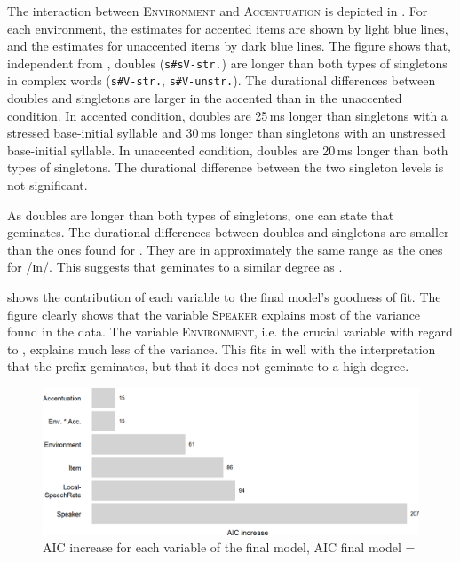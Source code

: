 The interaction between \textsc{Environment} and \textsc{Accentuation} is depicted in . For each environment, the estimates for accented items are shown by light blue lines, and the estimates for unaccented items by dark blue lines.
The figure shows that,  
independent from , doubles (\texttt{s\#sV-str.}) are longer than both types of singletons in complex words (\texttt{s\#V-str.}, \texttt{s\#V-unstr.}). The durational differences between doubles and singletons are larger in the accented than in the unaccented condition. 
In accented condition, doubles are 25\,ms longer than singletons with a stressed base-initial syllable and 30\,ms longer than singletons with an unstressed base-initial syllable. 
In unaccented condition, doubles are 20\,ms longer than both types of singletons. 
The durational difference between the two singleton levels is not significant.

As doubles are longer than both types of singletons, one can state that  geminates. The durational differences between doubles and singletons are smaller than the ones found for . They are in approximately the same range as the ones for /ɪn/. This suggests that  geminates to a similar degree as .



 shows the contribution of each variable to the final model's goodness of fit.
The figure clearly shows that the variable \textsc{Speaker} explains most of the variance found in the data. The variable 
\textsc{Environment}, i.e. the crucial variable with regard to , explains much less of the variance. This fits in well with the interpretation that the prefix  geminates, but that it does not geminate to a high degree.


\begin{figure}
	
	\includegraphics[scale=0.7]{images/Experiment/AICdecreaseDisComplex.png}
	\caption{AIC increase for each variable of the final model, AIC final model = }
	\label{fig:Effectsize dis experiment}

\end{figure}



